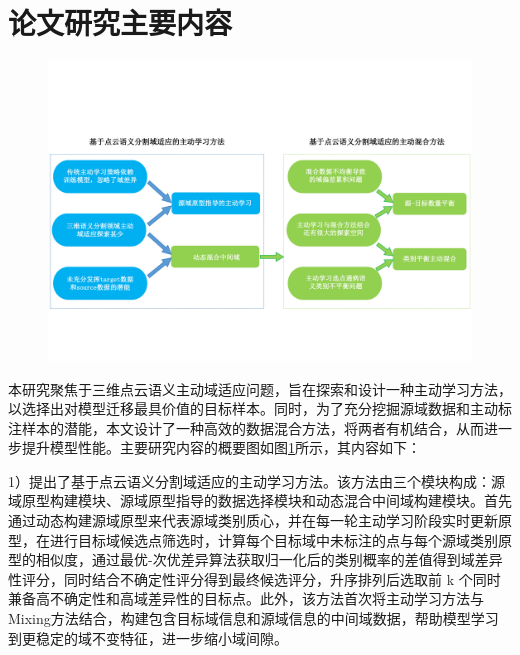 \section{论文研究主要内容}
\begin{figure}[H]
    \centering
    \includegraphics[width = \textwidth]{ljx/figure/1-2.pdf}
    \label{fig:1-2}
\end{figure}
\vspace{-1em}
本研究聚焦于三维点云语义主动域适应问题，旨在探索和设计一种主动学习方法，以选择出对模型迁移最具价值的目标样本。同时，为了充分挖掘源域数据和主动标注样本的潜能，本文设计了一种高效的数据混合方法，将两者有机结合，从而进一步提升模型性能。主要研究内容的概要图如图\ref{fig:1-2}所示，其内容如下：


1）提出了基于点云语义分割域适应的主动学习方法。该方法由三个模块构成：源域原型构建模块、源域原型指导的数据选择模块和动态混合中间域构建模块。首先通过动态构建源域原型来代表源域类别质心，并在每一轮主动学习阶段实时更新原型，在进行目标域候选点筛选时，计算每个目标域中未标注的点与每个源域类别原型的相似度，通过最优-次优差异算法获取归一化后的类别概率的差值得到域差异性评分，同时结合不确定性评分得到最终候选评分，升序排列后选取前 k 个同时兼备高不确定性和高域差异性的目标点。此外，该方法首次将主动学习方法与Mixing方法结合，构建包含目标域信息和源域信息的中间域数据，帮助模型学习到更稳定的域不变特征，进一步缩小域间隙。

